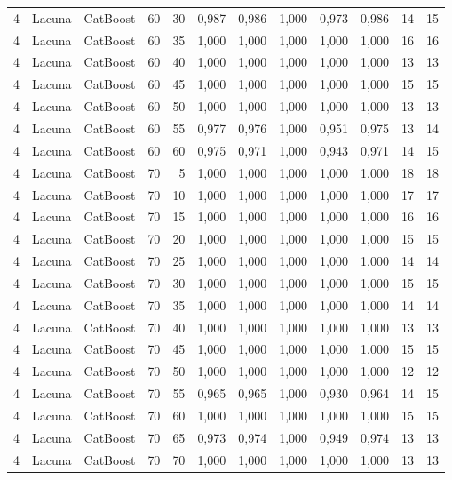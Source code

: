 \begin{longtable}{@{}rllrrrrrrrrr@{}}
4 & Lacuna & CatBoost & 60 & 30 & 0,987 & 0,986 & 1,000 & 0,973 & 0,986 & 14 & 15 \\
4 & Lacuna & CatBoost & 60 & 35 & 1,000 & 1,000 & 1,000 & 1,000 & 1,000 & 16 & 16 \\
4 & Lacuna & CatBoost & 60 & 40 & 1,000 & 1,000 & 1,000 & 1,000 & 1,000 & 13 & 13 \\
4 & Lacuna & CatBoost & 60 & 45 & 1,000 & 1,000 & 1,000 & 1,000 & 1,000 & 15 & 15 \\
4 & Lacuna & CatBoost & 60 & 50 & 1,000 & 1,000 & 1,000 & 1,000 & 1,000 & 13 & 13 \\
4 & Lacuna & CatBoost & 60 & 55 & 0,977 & 0,976 & 1,000 & 0,951 & 0,975 & 13 & 14 \\
4 & Lacuna & CatBoost & 60 & 60 & 0,975 & 0,971 & 1,000 & 0,943 & 0,971 & 14 & 15 \\
4 & Lacuna & CatBoost & 70 & 5 & 1,000 & 1,000 & 1,000 & 1,000 & 1,000 & 18 & 18 \\
4 & Lacuna & CatBoost & 70 & 10 & 1,000 & 1,000 & 1,000 & 1,000 & 1,000 & 17 & 17 \\
4 & Lacuna & CatBoost & 70 & 15 & 1,000 & 1,000 & 1,000 & 1,000 & 1,000 & 16 & 16 \\
4 & Lacuna & CatBoost & 70 & 20 & 1,000 & 1,000 & 1,000 & 1,000 & 1,000 & 15 & 15 \\
4 & Lacuna & CatBoost & 70 & 25 & 1,000 & 1,000 & 1,000 & 1,000 & 1,000 & 14 & 14 \\
4 & Lacuna & CatBoost & 70 & 30 & 1,000 & 1,000 & 1,000 & 1,000 & 1,000 & 15 & 15 \\
4 & Lacuna & CatBoost & 70 & 35 & 1,000 & 1,000 & 1,000 & 1,000 & 1,000 & 14 & 14 \\
4 & Lacuna & CatBoost & 70 & 40 & 1,000 & 1,000 & 1,000 & 1,000 & 1,000 & 13 & 13 \\
4 & Lacuna & CatBoost & 70 & 45 & 1,000 & 1,000 & 1,000 & 1,000 & 1,000 & 15 & 15 \\
4 & Lacuna & CatBoost & 70 & 50 & 1,000 & 1,000 & 1,000 & 1,000 & 1,000 & 12 & 12 \\
4 & Lacuna & CatBoost & 70 & 55 & 0,965 & 0,965 & 1,000 & 0,930 & 0,964 & 14 & 15 \\
4 & Lacuna & CatBoost & 70 & 60 & 1,000 & 1,000 & 1,000 & 1,000 & 1,000 & 15 & 15 \\
4 & Lacuna & CatBoost & 70 & 65 & 0,973 & 0,974 & 1,000 & 0,949 & 0,974 & 13 & 13 \\
4 & Lacuna & CatBoost & 70 & 70 & 1,000 & 1,000 & 1,000 & 1,000 & 1,000 & 13 & 13 \\

\end{longtable}
